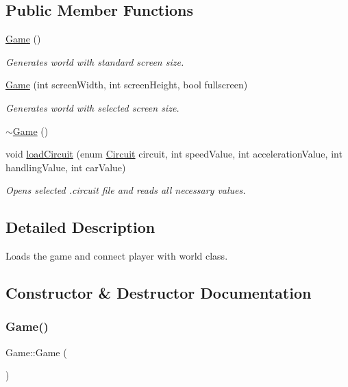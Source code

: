 \subsection*{Public Member Functions}
\begin{DoxyCompactItemize}
\item 
\mbox{\hyperlink{class_game_ad59df6562a58a614fda24622d3715b65}{Game}} ()
\begin{DoxyCompactList}\small\item\em Generates world with standard screen size. \end{DoxyCompactList}\item 
\mbox{\hyperlink{class_game_af2d18d34a602be70fc43b12d52964d07}{Game}} (int screen\+Width, int screen\+Height, bool fullscreen)
\begin{DoxyCompactList}\small\item\em Generates world with selected screen size. \end{DoxyCompactList}\item 
\mbox{\hyperlink{class_game_ae3d112ca6e0e55150d2fdbc704474530}{$\sim$\+Game}} ()
\item 
void \mbox{\hyperlink{class_game_a82cadd0c1af42e957ccdb47e8cf7ff04}{load\+Circuit}} (enum \mbox{\hyperlink{player_8h_a9c0489b2664a5ac943d6f70b3a8dcd67}{Circuit}} circuit, int speed\+Value, int acceleration\+Value, int handling\+Value, int car\+Value)
\begin{DoxyCompactList}\small\item\em Opens selected .circuit file and reads all necessary values. \end{DoxyCompactList}\end{DoxyCompactItemize}


\subsection{Detailed Description}
Loads the game and connect player with world class. 

\subsection{Constructor \& Destructor Documentation}
\mbox{\label{class_game_ad59df6562a58a614fda24622d3715b65}} 
\subsubsection{\texorpdfstring{Game()}{Game()}\hspace{0.1cm}{\footnotesize\ttfamily [1/2]}}
{\footnotesize\ttfamily Game\+::\+Game (\begin{DoxyParamCaption}{ }\end{DoxyParamCaption})}



